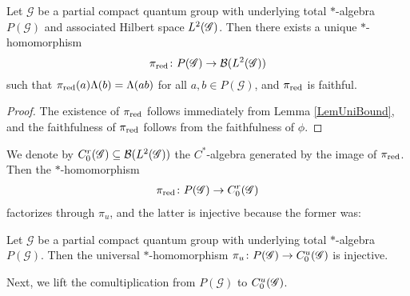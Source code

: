 \begin{Prop} \label{prop:gns} Let $\mathscr{G}$ be a partial compact
  quantum group with underlying total $*$-algebra $P(\mathscr{G})$ and
  associated Hilbert space $L^{2}(\mathscr{G})$. Then there exists a unique
  $*$-homomorphism \[\pi_{\operatorname{\mathrm{red}}}\colon P(\mathscr{G}) \to {\cal B}(L^{2}(\mathscr{G}))\]
  such that $\pi_{\operatorname{\mathrm{red}}}(a)\Lambda(b)=\Lambda(ab)$ for all $a,b\in
  P(\mathscr{G})$, and $\pi_{\operatorname{\mathrm{red}}}$ is faithful.
\end{Prop}
\begin{proof} The existence of $\pi_{\operatorname{\mathrm{red}}}$ follows immediately from Lemma \ref{LemUniBound}, and the faithfulness of $\pi_{\operatorname{\mathrm{red}}}$ follows from the faithfulness of $\phi$. 
\end{proof}
We denote by $C^{r}_{0}(\mathscr{G}) \subseteq {\cal B}(L^{2}(\mathscr{G}))$ the $C^{*}$-algebra  generated by the image
of $\pi_{\operatorname{\mathrm{red}}}$. Then the $*$-homomorphism
\begin{align*}
  \pi_{\operatorname{\mathrm{red}}} \colon P(\mathscr{G}) \to C^{r}_{0}(\mathscr{G})
\end{align*}
 factorizes through $\pi_{u}$, and the latter is injective because the former was:
\begin{Cor}
  Let $\mathscr{G}$ be a partial compact quantum group with underlying
  total $*$-algebra $P(\mathscr{G})$. Then the
universal $*$-homomorphism $\pi_{u} \colon P(\mathscr{G}) \to C^{u}_{0}(\mathscr{G})$ is injective.
\end{Cor}



Next, we lift  the comultiplication from $P(\mathscr{G})$  to $C^{u}_{0}(\mathscr{G})$.

